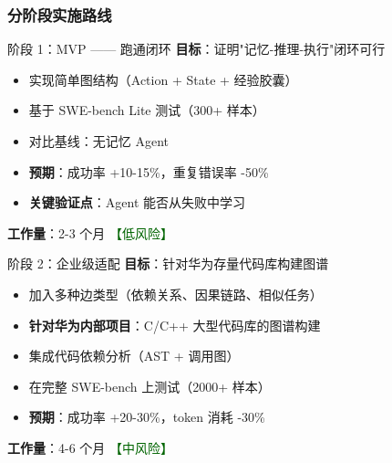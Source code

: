 \documentclass[aspectratio=169,10pt]{beamer}
\begin{document}
\begin{frame}
  \frametitle{分阶段实施路线}

  \begin{block}{阶段 1：MVP —— 跑通闭环}
    \footnotesize
    \textbf{目标}：\textcolor{dotred}{证明"记忆-推理-执行"闭环可行}

    \begin{itemize}
      \item 实现简单图结构（Action + State + 经验胶囊）
      \item 基于 SWE-bench Lite 测试（300+ 样本）
      \item 对比基线：无记忆 Agent
      \item \textbf{预期}：成功率 +10-15\%，重复错误率 -50\%
      \item \textbf{关键验证点}：Agent 能否从失败中学习
    \end{itemize}

    \textbf{工作量}：2-3 个月 \quad \textcolor{darkgreen}{【低风险】}
  \end{block}

  \begin{block}{阶段 2：企业级适配}
    \footnotesize
    \textbf{目标}：\textcolor{dotred}{针对华为存量代码库构建图谱}

    \begin{itemize}
      \item 加入多种边类型（依赖关系、因果链路、相似任务）
      \item \textbf{针对华为内部项目}：C/C++ 大型代码库的图谱构建
      \item 集成代码依赖分析（AST + 调用图）
      \item 在完整 SWE-bench 上测试（2000+ 样本）
      \item \textbf{预期}：成功率 +20-30\%，token 消耗 -30\%
    \end{itemize}

    \textbf{工作量}：4-6 个月 \quad \textcolor{darkgreen}{【中风险】}
  \end{block}
\end{frame}
\end{document}
